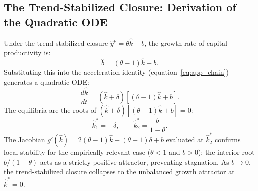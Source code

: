 \subsection{The Trend-Stabilized Closure: Derivation of the Quadratic ODE}
\label{app:extended_derivation}

Under the trend-stabilized closure $\hat{y}^p = \theta\hat{k} + b$, the growth rate of capital productivity is:
\begin{equation}\label{eq:app_bhat_extended}
    \hat{b} = (\theta - 1)\hat{k} + b.
\end{equation}
Substituting this into the acceleration identity (equation~\ref{eq:app_chain}) generates a quadratic ODE:
\begin{equation}\label{eq:app_extended_ode}
    \frac{d\hat{k}}{dt} = (\hat{k} + \delta)\left[(\theta - 1)\hat{k} + b\right].
\end{equation}
The equilibria are the roots of $(\hat{k} + \delta)[(\theta - 1)\hat{k} + b] = 0$:
\begin{equation}\label{eq:app_extended_roots}
    \hat{k}_1^* = -\delta, \qquad \hat{k}_2^* = \frac{b}{1 - \theta}.
\end{equation}
The Jacobian $g'(\hat{k}) = 2(\theta - 1)\hat{k} + (\theta-1)\delta + b$ evaluated at $\hat{k}_2^*$ confirms local stability for the empirically relevant case ($\theta < 1$ and $b > 0$): the interior root $b/(1-\theta)$ acts as a strictly positive attractor, preventing stagnation. As $b \to 0$, the trend-stabilized closure collapses to the unbalanced growth attractor at $\hat{k}^* = 0$.